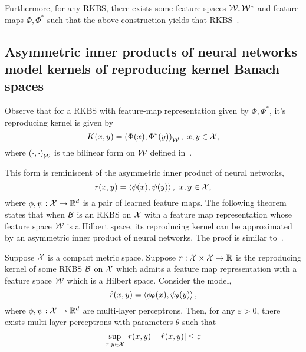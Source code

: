 Furthermore, for any RKBS, there exists some feature spaces ${\mathcal{W}}, {\mathcal{W}}^*$ and feature maps $\Phi, \Phi^*$ such that the above construction yields that RKBS~\parencite[Theorem 4]{zhangReproducingKernel2009}.

\subsection{Asymmetric inner products of neural networks model kernels of reproducing kernel Banach spaces}

Observe that for a RKBS with feature-map representation given by $\Phi, \Phi^*$, it's reproducing kernel is given by
\begin{equation}
    K(x, y) = \left(\Phi(x), \Phi^*(y)\right)_{{\mathcal{W}}}, \ x, y \in {\mathcal{X}},
\end{equation}
where $\left(\cdot, \cdot\right)_{{\mathcal{W}}}$ is the bilinear form on ${\mathcal{W}}$ defined in~.

This form is reminiscent of the asymmetric inner product of neural networks,
\begin{equation}
    r(x, y) = \left \langle \phi(x), \psi(y) \right\rangle, \ x, y \in {\mathcal{X}},
\end{equation}
where $\phi, \psi: {\mathcal{X}} \to \mathbb{R}^{d}$ is a pair of learned feature maps. The following theorem states that when ${\mathcal{B}}$ is an RKBS on ${\mathcal{X}}$ with a feature map representation whose feature space ${\mathcal{W}}$ is a Hilbert space, its reproducing kernel can be approximated by an asymmetric inner product of neural networks. The proof is similar to~.

\begin{theorem}\label{thm:asymmetric_inner_prod_approximates_rkbs}
   Suppose ${\mathcal{X}}$ is a compact metric space. Suppose $r: {\mathcal{X}} \times {\mathcal{X}} \to \mathbb{R}$ is the reproducing kernel of some RKBS ${\mathcal{B}}$ on ${\mathcal{X}}$ which admits a feature map representation with a feature space ${\mathcal{W}}$ which is a Hilbert space. Consider the model,
   \begin{equation}
    \hat{r}(x, y) = \left \langle \phi_\theta(x), \psi_\theta(y) \right\rangle,
   \end{equation}
    where $\phi, \psi: {\mathcal{X}} \to \mathbb{R}^{d}$ are multi-layer perceptrons. Then, for any $\varepsilon > 0$, there exists multi-layer perceptrons with parameters $\theta$ such that
   \begin{equation*}
        \sup_{x,y \in {\mathcal{X}}} \left\lvert r(x, y) - \hat{r}(x, y)\right\rvert \leq \varepsilon
   \end{equation*}
\end{theorem}

